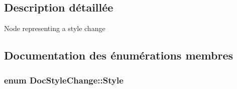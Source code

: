 \subsection{Description détaillée}
Node representing a style change 

\subsection{Documentation des énumérations membres}
\hypertarget{class_doc_style_change_a97757d2d85c39228c90693491a56d277}{}
\subsubsection[{Style}]{\setlength{\rightskip}{0pt plus 5cm}enum {\bf Doc\+Style\+Change\+::\+Style}}\label{class_doc_style_change_a97757d2d85c39228c90693491a56d277}
